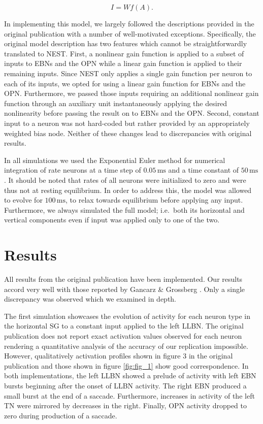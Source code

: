 \documentclass[10pt,a4paper,onecolumn]{article}
\begin{document}
\begin{equation}
I = Wf(A)\textrm{.}
\label{eq:stim}\end{equation}

In implementing this model, we largely followed the descriptions
provided in the original publication with a number of well-motivated
exceptions. Specifically, the original model description has two
features which cannot be straightforwardly translated to NEST. First, a
nonlinear gain function is applied to a subset of inputs to EBNs and the
OPN while a linear gain function is applied to their remaining inputs.
Since NEST only applies a single gain function per neuron to each of its
inputs, we opted for using a linear gain function for EBNs and the OPN.
Furthermore, we passed those inputs requiring an additional nonlinear
gain function through an auxiliary unit instantaneously applying the
desired nonlinearity before passing the result on to EBNs and the OPN.
Second, constant input to a neuron was not hard-coded but rather
provided by an appropriately weighted bias node. Neither of these
changes lead to discrepancies with original results.

In all simulations we used the Exponential Euler method for numerical
integration of rate neurons \autocite{Hahne2017} at a time step of
\(0.05\,\mathrm{ms}\) and a time constant of \(50\,\mathrm{ms}\). It
should be noted that rates of all neurons were initialized to zero and
were thus not at resting equilibrium. In order to address this, the
model was allowed to evolve for \(100\,\mathrm{ms}\), to relax towards
equilibrium before applying any input. Furthermore, we always simulated
the full model; i.e.~both its horizontal and vertical components even if
input was applied only to one of the two.

\section{Results}\label{results}

All results from the original publication have been implemented. Our
results accord very well with those reported by Gancarz \& Grossberg
\autocite{Gancarz1998}. Only a single discrepancy was observed which we
examined in depth.

The first simulation showcases the evolution of activity for each neuron
type in the horizontal SG to a constant input applied to the left LLBN.
The original publication does not report exact activation values
observed for each neuron rendering a quantitative analysis of the
accuracy of our replication impossible. However, qualitatively
activation profiles shown in figure 3 in the original publication and
those shown in figure \ref{fig:fig_1} show good correspondence. In both
implementations, the left LLBN showed a prelude of activity with left
EBN bursts beginning after the onset of LLBN activity. The right EBN
produced a small burst at the end of a saccade. Furthermore, increases
in activity of the left TN were mirrored by decreases in the right.
Finally, OPN activity dropped to zero during production of a saccade.
\end{document}
